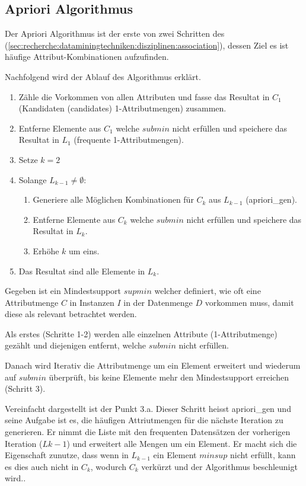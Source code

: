 \subsection{Apriori Algorithmus}
Der Apriori Algorithmus ist der erste von zwei Schritten des  (\cref{sec:recherche:dataminingtechniken:disziplinen:association}), dessen Ziel es ist häufige Attribut-Kombinationen aufzufinden. 

Nachfolgend wird der Ablauf des Algorithmus erklärt.
\begin{enumerate}
\item Zähle die Vorkommen von allen Attributen und fasse das Resultat in $C_1$ (Kandidaten (candidates) 1-Attributmengen) zusammen.
\item Entferne Elemente aus $C_1$ welche $submin$ nicht erfüllen und speichere das Resultat in $L_1$ (frequente 1-Attributmengen).
\item Setze $k=2$
\item Solange $L_{k-1} \neq \emptyset$:
	\begin {enumerate}
	\item Generiere alle Möglichen Kombinationen für $C_k$ aus $L_{k-1}$ (apriori\_gen).
	\item Entferne Elemente aus $C_k$ welche $submin$ nicht erfüllen und speichere das Resultat in $L_k$.
	\item Erhöhe $k$ um eins.
\end{enumerate}
\item Das Resultat sind alle Elemente in $L_k$.
\end{enumerate}

Gegeben ist ein Mindestsupport $supmin$ welcher definiert, wie oft eine Attributmenge $C$ in Instanzen $I$ in der Datenmenge $D$ vorkommen muss, damit diese als relevant betrachtet werden. 

Als erstes (Schritte 1-2) werden alle einzelnen Attribute (1-Attributmenge) gezählt und diejenigen entfernt, welche $submin$ nicht erfüllen.

Danach wird Iterativ die Attributmenge um ein Element erweitert und wiederum auf $submin$ überprüft, bis keine Elemente mehr den Mindestsupport erreichen (Schritt 3).

Vereinfacht dargestellt ist der Punkt 3.a. Dieser Schritt heisst apriori\_gen und seine Aufgabe ist es, die häufigen Attriutmengen für die nächste Iteration zu generieren. Er nimmt die Liste mit den frequenten Datensätzen der vorherigen Iteration ($L{k-1}$) und erweitert alle Mengen um ein Element. Er macht sich die Eigenschaft zunutze, dass wenn in $L_{k-1}$ ein Element $minsup$ nicht erfüllt, kann es dies auch nicht in $C_k$, wodurch $C_k$ verkürzt und der Algorithmus beschleunigt wird..

